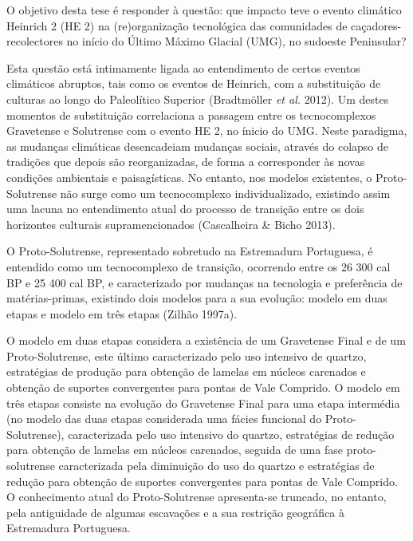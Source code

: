 \documentclass[12pt,twoside]{reedthesis}
\begin{document}
  \begin{resumo}
    O objetivo desta tese é responder à questão: que impacto teve o evento climático Heinrich 2 (HE 2) na (re)organização tecnológica das comunidades de caçadores-recolectores no início do Último Máximo Glacial (UMG), no sudoeste Peninsular?
    
    \par
    
    Esta questão está intimamente ligada ao entendimento de certos eventos climáticos abruptos, tais como os eventos de Heinrich, com a substituição de culturas ao longo do Paleolítico Superior (Bradtmöller \emph{et al.} 2012). Um destes momentos de substituição correlaciona a passagem entre os tecnocomplexos Gravetense e Solutrense com o evento HE 2, no ínicio do UMG. Neste paradigma, as mudanças climáticas desencadeiam mudanças sociais, através do colapso de tradições que depois são reorganizadas, de forma a corresponder às novas condições ambientais e paisagísticas. No entanto, nos modelos existentes, o Proto-Solutrense não surge como um tecnocomplexo individualizado, existindo assim uma lacuna no entendimento atual do processo de transição entre os dois horizontes culturais supramencionados (Cascalheira \& Bicho 2013).
    
    O Proto-Solutrense, representado sobretudo na Estremadura Portuguesa, é entendido como um tecnocomplexo de transição, ocorrendo entre os 26 300 cal BP e 25 400 cal BP, e caracterizado por mudanças na tecnologia e preferência de matérias-primas, existindo dois modelos para a sua evolução: modelo em duas etapas e modelo em três etapas (Zilhão 1997a).
    
    O modelo em duas etapas considera a existência de um Gravetense Final e de um Proto-Solutrense, este último caracterizado pelo uso intensivo de quartzo, estratégias de produção para obtenção de lamelas em núcleos carenados e obtenção de suportes convergentes para pontas de Vale Comprido. O modelo em três etapas consiste na evolução do Gravetense Final para uma etapa intermédia (no modelo das duas etapas considerada uma fácies funcional do Proto-Solutrense), caracterizada pelo uso intensivo do quartzo, estratégias de redução para obtenção de lamelas em núcleos carenados, seguida de uma fase proto-solutrense caracterizada pela diminuição do uso do quartzo e estratégias de redução para obtenção de suportes convergentes para pontas de Vale Comprido.
    O conhecimento atual do Proto-Solutrense apresenta-se truncado, no entanto, pela antiguidade de algumas escavações e a sua restrição geográfica à Estremadura Portuguesa.
    

\end{resumo}
\end{document}
